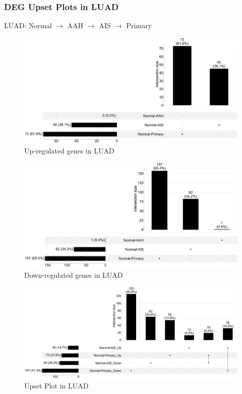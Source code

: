 \documentclass{beamer}
\begin{document}
    \begin{frame}[allowframebreaks]
        \frametitle{DEG Upset Plots in LUAD}
        LUAD: Normal $\rightarrow$ AAH $\rightarrow$ AIS $\rightarrow$ Primary

        \begin{figure}
            \includegraphics[width=0.8 \linewidth]{figures/DEG/Pair-Venn/STAR.FPKM.ADC.Up.venn.pdf}
            \caption{Up-regulated genes in LUAD}
        \end{figure}

        \begin{figure}
            \includegraphics[width=0.8 \linewidth]{figures/DEG/Pair-Venn/STAR.FPKM.ADC.Down.venn.pdf}
            \caption{Down-regulated genes in LUAD}
        \end{figure}

        \begin{figure}
            \includegraphics[width=0.8 \linewidth]{figures/DEG/Pair-Venn/STAR.FPKM.ADC.venn.pdf}
            \caption{Upset Plot in LUAD}
        \end{figure}
    \end{frame}
\end{document}
